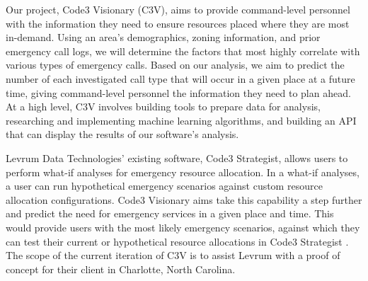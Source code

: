 \documentclass[onecolumn, draftclsnofoot,10pt, compsoc]{IEEEtran}
\begin{document}
\begin{singlespace}
    Our project, Code3 Visionary (C3V), aims to provide command-level personnel with the information they need to ensure resources placed where they are most in-demand. 
    Using an area's demographics, zoning information, and prior emergency call logs, we will determine the factors that most highly correlate with various types of emergency calls.
    Based on our analysis, we aim to predict the number of each investigated call type that will occur in a given place at a future time, giving command-level personnel the information they need to plan ahead.
    At a high level, C3V involves building tools to prepare data for analysis, researching and implementing machine learning algorithms, and building an API that can display the results of our software's analysis. 
        
    Levrum Data Technologies' existing software, Code3 Strategist, allows users to perform what-if analyses for emergency resource allocation.
    In a what-if analyses, a user can run hypothetical emergency scenarios against custom resource allocation configurations.
    Code3 Visionary aims take this capability a step further and predict the need for emergency services in a given place and time.
    This would provide users with the most likely emergency scenarios, against which they can test their current or hypothetical resource allocations in Code3 Strategist \cite{TechReview}. 
    The scope of the current iteration of C3V is to assist Levrum with a proof of concept for their client in Charlotte, North Carolina.
    

\end{singlespace}
\end{document}
